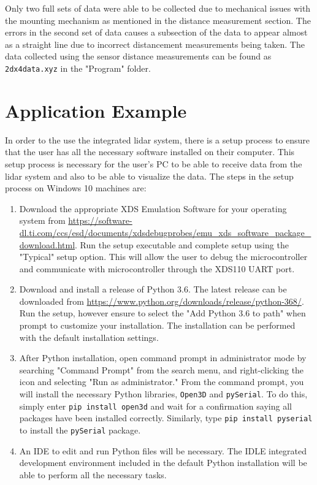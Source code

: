 \documentclass[12pt]{article}
\begin{document}
Only two full sets of data were able to be collected due to mechanical issues with the mounting mechanism as mentioned in the distance measurement section. The errors in the second set of data causes a subsection of the data to appear almost as a straight line due to incorrect distancement measurements being taken. The data collected using the sensor distance measurements can be found as \texttt{2dx4data.xyz} in the "Program" folder.
\section*{Application Example}
In order to the use the integrated lidar system, there is a setup process to ensure that the user has all the necessary software installed on their computer. This setup process is necessary for the user's PC to be able to receive data from the lidar system and also to be able to visualize the data. The steps in the setup process on Windows 10 machines are:
\sloppy
\begin{enumerate}
    \item Download the appropriate XDS Emulation Software for your operating system from \url{https://software-dl.ti.com/ccs/esd/documents/xdsdebugprobes/emu_xds_software_package_download.html}. Run the setup executable and complete setup using the "Typical" setup option. This will allow the user to debug the microcontroller and communicate with microcontroller through the XDS110 UART port.
    \item Download and install a release of Python 3.6. The latest release can be downloaded from \url{https://www.python.org/downloads/release/python-368/}. Run the setup, however ensure to select the "Add Python 3.6 to path" when prompt to customize your installation. The installation can be performed with the default installation settings.
    \item After Python installation, open command prompt in administrator mode by searching "Command Prompt" from the search menu, and right-clicking the icon and selecting "Run as administrator." From the command prompt, you will install the necessary Python libraries, \texttt{Open3D} and \texttt{pySerial}. To do this, simply enter \texttt{pip install open3d} and wait for a confirmation saying all packages have been installed correctly. Similarly, type \texttt{pip install pyserial} to install the \texttt{pySerial} package.
    \item An IDE to edit and run Python files will be necessary. The IDLE integrated development environment included in the default Python installation will be able to perform all the necessary tasks.
\end{enumerate}
\end{document}
